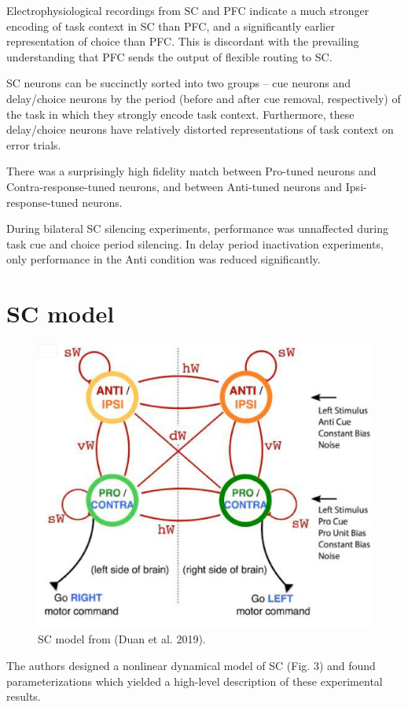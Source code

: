 \documentclass[11pt]{article}
\begin{document}
Electrophysiological recordings from SC and PFC indicate a much stronger encoding of task context in SC than PFC, and a significantly earlier representation of choice than PFC.  This is discordant with the prevailing understanding that PFC sends the output of flexible routing to SC.

SC neurons can be succinctly sorted into two groups -- cue neurons and delay/choice neurons by the period (before and after cue removal, respectively) of the task in which they strongly encode task context.  Furthermore, these delay/choice neurons have relatively distorted representations of task context on error trials.

There was a surprisingly high fidelity match between Pro-tuned neurons and Contra-response-tuned neurons, and between Anti-tuned neurons and Ipsi-response-tuned neurons.

During bilateral SC silencing experiments, performance was unnaffected during task cue and choice period silencing.  In delay period inactivation experiments, only performance in the Anti condition was reduced significantly.

\section{SC model}
\begin{figure}
\vspace{-.8cm}
 \caption{\label{fig:fig3} SC model from (Duan et al. 2019).}
  \begin{center}  
\includegraphics[scale=.3]{figs/Duan_2019_Fig6_clean.png} 
\end{center}
\end{figure}
The authors designed a nonlinear dynamical model of SC (Fig. 3) and found parameterizations which yielded a high-level description of these experimental results.
\end{document}
